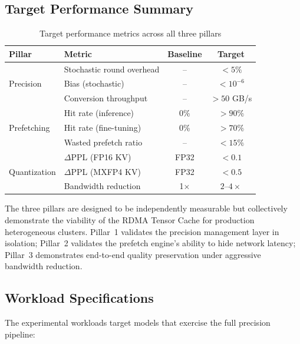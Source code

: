 \documentclass[11pt,letterpaper]{article}
\theoremstyle{definition}
\begin{document}
\subsection{Target Performance Summary}

\begin{table}[htbp]
\centering
\caption{Target performance metrics across all three pillars}
\label{tab:target-metrics}
\begin{tabular}{@{}llcc@{}}
\toprule
\textbf{Pillar} & \textbf{Metric} & \textbf{Baseline} & \textbf{Target} \\
\midrule
\multirow{3}{*}{Precision} & Stochastic round overhead & -- & $< 5\%$ \\
 & Bias (stochastic) & -- & $< 10^{-6}$ \\
 & Conversion throughput & -- & $> 50$ GB/s \\
\midrule
\multirow{3}{*}{Prefetching} & Hit rate (inference) & 0\% & $> 90\%$ \\
 & Hit rate (fine-tuning) & 0\% & $> 70\%$ \\
 & Wasted prefetch ratio & -- & $< 15\%$ \\
\midrule
\multirow{3}{*}{Quantization} & $\Delta$PPL (FP16 KV) & FP32 & $< 0.1$ \\
 & $\Delta$PPL (MXFP4 KV) & FP32 & $< 0.5$ \\
 & Bandwidth reduction & 1$\times$ & $2$--$4\times$ \\
\bottomrule
\end{tabular}
\end{table}

The three pillars are designed to be independently measurable but collectively demonstrate the viability of the RDMA Tensor Cache for production heterogeneous clusters. Pillar~1 validates the precision management layer in isolation; Pillar~2 validates the prefetch engine's ability to hide network latency; Pillar~3 demonstrates end-to-end quality preservation under aggressive bandwidth reduction.

\subsection{Workload Specifications}

The experimental workloads target models that exercise the full precision pipeline:
\end{document}
